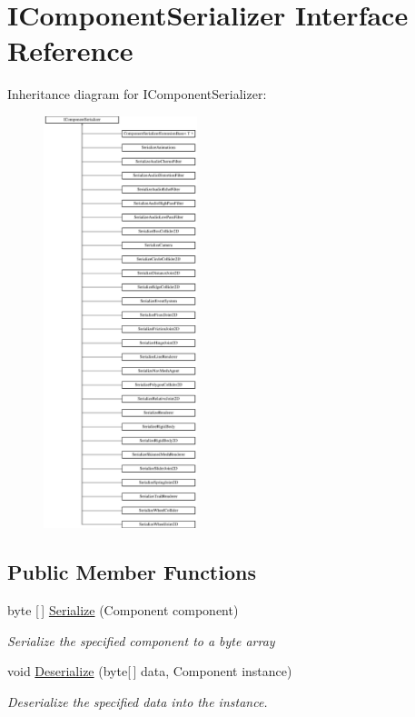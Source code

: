 \hypertarget{interface_i_component_serializer}{}\section{I\+Component\+Serializer Interface Reference}
\label{interface_i_component_serializer}
Inheritance diagram for I\+Component\+Serializer\+:\begin{figure}[H]
\begin{center}
\leavevmode
\includegraphics[height=12.000000cm]{interface_i_component_serializer}
\end{center}
\end{figure}
\subsection*{Public Member Functions}
\begin{DoxyCompactItemize}
\item 
byte \mbox{[}$\,$\mbox{]} \hyperlink{interface_i_component_serializer_ab2aa38005665496b62d6c54b5f0dbd31}{Serialize} (Component component)
\begin{DoxyCompactList}\small\item\em Serialize the specified component to a byte array \end{DoxyCompactList}\item 
void \hyperlink{interface_i_component_serializer_a4cc366a5c78b33d47a90c209d8fed883}{Deserialize} (byte\mbox{[}$\,$\mbox{]} data, Component instance)
\begin{DoxyCompactList}\small\item\em Deserialize the specified data into the instance. \end{DoxyCompactList}\end{DoxyCompactItemize}


